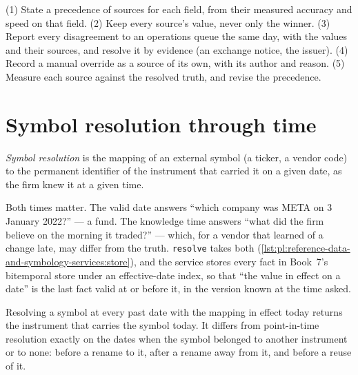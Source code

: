 \begin{method}\label{met:pl:reference-data-and-symbology-services:golden}
(1) State a precedence of sources for each field, from their measured accuracy and speed on that field. (2) Keep every source's
value, never only the winner. (3) Report every disagreement to an operations queue the same day, with the values and their
sources, and resolve it by evidence (an exchange notice, the issuer). (4) Record a manual override as a source of its own, with
its author and reason. (5) Measure each source against the resolved truth, and revise the precedence.
\end{method}

\section{Symbol resolution through time}

\begin{definition}\label{def:pl:reference-data-and-symbology-services:resolution}
\emph{Symbol resolution} is the mapping of an external symbol (a ticker, a vendor code) to the permanent
identifier of the instrument that carried it on a given date, as the firm knew it at a given time.
\end{definition}

Both times matter. The valid date answers ``which company was META on 3 January 2022?'' --- a fund. The knowledge time answers
``what did the firm believe on the morning it traded?'' --- which, for a vendor that learned of a change late, may differ from the
truth. \texttt{resolve} takes both (\cref{lst:pl:reference-data-and-symbology-services:store}), and the service stores every fact
in Book~7's bitemporal store under an effective-date index, so that ``the value in effect on a date'' is the last fact valid at or
before it, in the version known at the time asked.

\label{lst:pl:reference-data-and-symbology-services:store}

\begin{proposition}\label{prop:pl:reference-data-and-symbology-services:today}
Resolving a symbol at every past date with the mapping in effect today returns the instrument that carries the symbol today. It
differs from point-in-time resolution exactly on the dates when the symbol belonged to another instrument or to none: before a
rename to it, after a rename away from it, and before a reuse of it.
\end{proposition}

